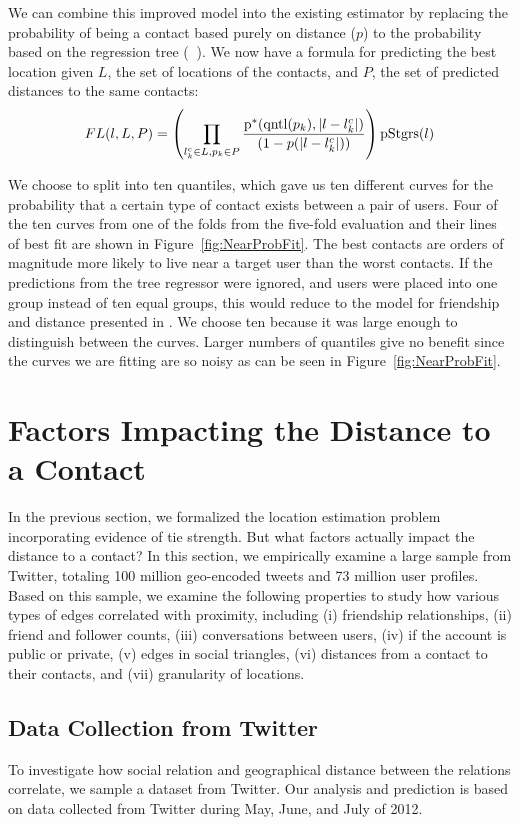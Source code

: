 \documentclass{sig-alternate}
\DeclareMathOperator{\pContact}{p^\ast}
\DeclareMathOperator{\pStrangers}{pStgrs}
\DeclareMathOperator{\quantile}{qntl}
\begin{document}
We can combine this improved model into the existing estimator by
replacing the probability of being a contact based purely on distance ($p$) to
the probability based on the regression tree ($\pContact$).
%
We now have a formula for predicting the best location given $L$, the set of
locations of the contacts, and $P$, the set of predicted distances to the same
contacts:
\[
    FL(l,L,P) =
        \left(
            \prod_{l^c_k \in L,p_k \in P}
            {\pContact(\quantile(p_k),|l-l^c_k|) \over (1-p(|l-l^c_k|))}
        \right)
        \pStrangers(l)
\]


We choose to split into ten quantiles, which gave us ten different curves for
the probability that a certain type of contact exists between a pair of users.
%
Four of the ten curves from one of the folds from the five-fold evaluation and
their lines of best fit are shown in Figure~\ref{fig:NearProbFit}.
%
The best contacts are orders of magnitude more likely to live near a target
user than the worst contacts.
%
If the predictions from the tree regressor were ignored, and users were placed
into one group instead of ten equal groups, this would reduce to the model for
friendship and distance presented in \cite{backstrom2010find}.
%
We choose ten because it was large enough to distinguish between the curves.
%
Larger numbers of quantiles give no benefit since the curves we are fitting
are so noisy as can be seen in Figure~\ref{fig:NearProbFit}.


\section{Factors Impacting the Distance to a Contact}
In the previous section, we formalized the location estimation problem
incorporating evidence of tie strength.
%
But what factors actually impact the distance to a contact? In this section, we
empirically examine a large sample from Twitter, totaling 100 million
geo-encoded tweets and 73 million user profiles.
%
Based on this sample, we examine the following properties to study how various
types of edges correlated with proximity, including
    (i) friendship relationships,
    (ii) friend and follower counts,
    (iii) conversations between users,
    (iv) if the account is public or private,
    (v) edges in social triangles,
    (vi) distances from a contact to their contacts, and
    (vii) granularity of locations.

\subsection{Data Collection from Twitter}
To investigate how social relation and geographical distance between the
relations correlate, we sample a dataset from Twitter.
%
Our analysis and prediction is based on data collected from Twitter during
May, June, and July of 2012.
\end{document}
